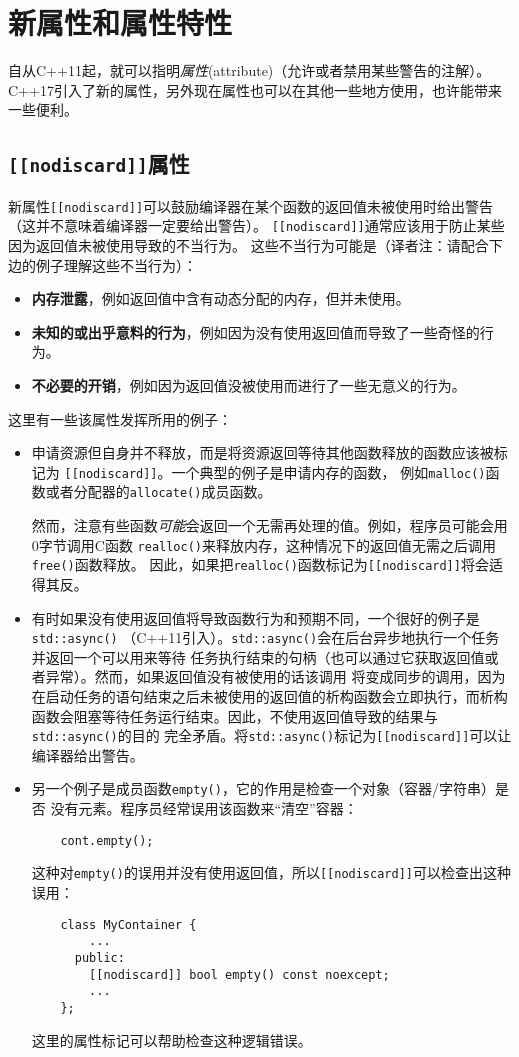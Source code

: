 \chapter{新属性和属性特性}\label{ch7}
自从C++11起，就可以指明\emph{属性}(attribute)（允许或者禁用某些警告的注解）。
C++17引入了新的属性，另外现在属性也可以在其他一些地方使用，也许能带来一些便利。

\section{\texttt{[[nodiscard]]}属性}\label{ch7.1}
新属性\texttt{[[nodiscard]]}可以鼓励编译器在某个函数的返回值未被使用时给出警告
（这并不意味着编译器一定要给出警告）。
\texttt{[[nodiscard]]}通常应该用于防止某些因为返回值未被使用导致的不当行为。
这些不当行为可能是（译者注：请配合下边的例子理解这些不当行为）：
\begin{itemize}
    \item \textbf{内存泄露}，例如返回值中含有动态分配的内存，但并未使用。
    \item \textbf{未知的或出乎意料的行为}，例如因为没有使用返回值而导致了一些奇怪的行为。
    \item \textbf{不必要的开销}，例如因为返回值没被使用而进行了一些无意义的行为。
\end{itemize}
这里有一些该属性发挥所用的例子：
\begin{itemize}
    \item 申请资源但自身并不释放，而是将资源返回等待其他函数释放的函数应该被标记为
    \texttt{[[nodiscard]]}。一个典型的例子是申请内存的函数，
    例如\texttt{malloc()}函数或者分配器的\texttt{allocate()}成员函数。

    然而，注意有些函数\emph{可能}会返回一个无需再处理的值。例如，程序员可能会用0字节调用C函数
    \texttt{realloc()}来释放内存，这种情况下的返回值无需之后调用\texttt{free()}函数释放。
    因此，如果把\texttt{realloc()}函数标记为\texttt{[[nodiscard]]}将会适得其反。
    \item 有时如果没有使用返回值将导致函数行为和预期不同，一个很好的例子是\texttt{std::async()}
    （C++11引入）。\texttt{std::async()}会在后台异步地执行一个任务并返回一个可以用来等待
    任务执行结束的句柄（也可以通过它获取返回值或者异常）。然而，如果返回值没有被使用的话该调用
    将变成同步的调用，因为在启动任务的语句结束之后未被使用的返回值的析构函数会立即执行，而析构
    函数会阻塞等待任务运行结束。因此，不使用返回值导致的结果与\texttt{std::async()}的目的
    完全矛盾。将\texttt{std::async()}标记为\texttt{[[nodiscard]]}可以让编译器给出警告。
    \item 另一个例子是成员函数\texttt{empty()}，它的作用是检查一个对象（容器/字符串）是否
    没有元素。程序员经常误用该函数来“清空”容器：
    \begin{lstlisting}
    cont.empty();
    \end{lstlisting}
    这种对\texttt{empty()}的误用并没有使用返回值，所以\texttt{[[nodiscard]]}可以检查出这种误用：
    \begin{lstlisting}
    class MyContainer {
        ...
      public:
        [[nodiscard]] bool empty() const noexcept;
        ...
    };
    \end{lstlisting}
    这里的属性标记可以帮助检查这种逻辑错误。
\end{itemize}

